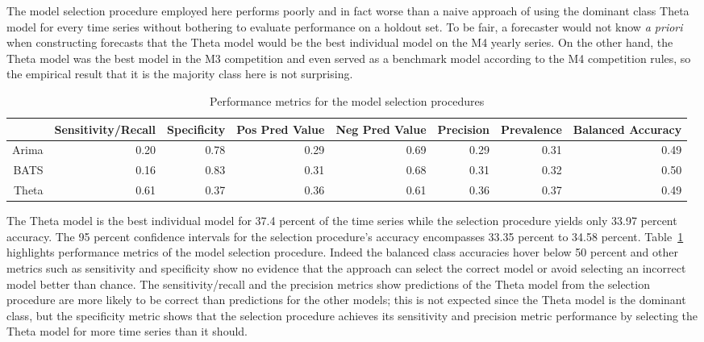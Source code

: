 \documentclass[11pt,3p,review,authoryear]{elsarticle}
\begin{document}
The model selection procedure employed here performs poorly and in fact worse than a naive approach of using the dominant class Theta model for every time series without bothering to evaluate performance on a holdout set. To be fair, a forecaster would not know \textit{a priori} when constructing forecasts that the Theta model would be the best individual model on the M4 yearly series. On the other hand, the Theta model was the best model in the M3 competition and even served as a benchmark model according to the M4 competition rules, so the empirical result that it is the majority class here is not surprising.

\begin{table}[ht]
\centering
\begin{adjustbox}{width=1\textwidth}
\begin{tabular}{rrrrrrrr}
  \hline
 & Sensitivity/Recall & Specificity & Pos Pred Value & Neg Pred Value & Precision & Prevalence & Balanced Accuracy \\ 
  \hline
Arima & 0.20 & 0.78 & 0.29 & 0.69 & 0.29 & 0.31 & 0.49 \\ 
  BATS & 0.16 & 0.83 & 0.31 & 0.68 & 0.31 & 0.32 & 0.50 \\ 
  Theta & 0.61 & 0.37 & 0.36 & 0.61 & 0.36 & 0.37 & 0.49 \\ 
   \hline
\end{tabular}
\end{adjustbox}
\caption{Performance metrics for the model selection procedures}\label{tab:b}
\end{table}

The Theta model is the best individual model for 37.4 percent of the time series while the selection procedure yields only 33.97 percent accuracy. The 95 percent confidence intervals for the selection procedure's accuracy encompasses 33.35 percent to 34.58 percent. Table~\ref{tab:b} highlights performance metrics of the model selection procedure. Indeed the balanced class accuracies hover below 50 percent and other metrics such as sensitivity and specificity show no evidence that the approach can select the correct model or avoid selecting an incorrect model better than chance. The sensitivity/recall and the precision metrics show predictions of the Theta model from the selection procedure are more likely to be correct than predictions for the other models; this is not expected since the Theta model is the dominant class, but the specificity metric shows that the selection procedure achieves its sensitivity and precision metric performance by selecting the Theta model for more time series than it should.
\end{document}
